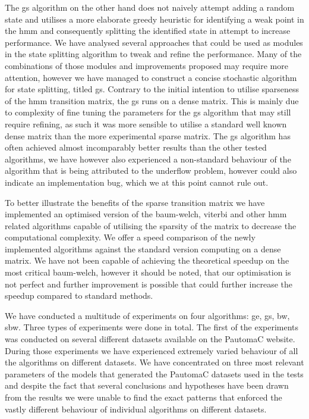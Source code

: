 The \acrlong{gs} algorithm on the other hand does not naively attempt adding a random state and utilises a more elaborate greedy heuristic for identifying a weak point in the \gls{hmm} and consequently splitting the identified state in attempt to increase performance. We have analysed several approaches that could be used as modules in the state splitting algorithm to tweak and refine the performance. Many of the combinations of those modules and improvements proposed may require more attention, however we have managed to construct a concise stochastic algorithm for state splitting, titled \acrlong{gs}. Contrary to the initial intention to utilise sparseness of the \gls{hmm} transition matrix, the \gls{gs} runs on a dense matrix. This is mainly due to complexity of fine tuning the parameters for the \gls{gs} algorithm that may still require refining, as such it was more sensible to utilise a standard well known dense matrix than the more experimental sparse matrix. The \gls{gs} algorithm has often achieved almost incomparably better results than the other tested algorithms, we have however also experienced a non-standard behaviour of the algorithm that is being attributed to the underflow problem, however could also indicate an implementation bug, which we at this point cannot rule out.

To better illustrate the benefits of the sparse transition matrix we have implemented an optimised version of the \gls{baum-welch}, \gls{viterbi} and other \gls{hmm} related algorithms capable of utilising the sparsity of the matrix to decrease the computational complexity. We offer a speed comparison of the newly implemented algorithms against the standard version computing on a dense matrix. We have not been capable of achieving the theoretical speedup on the most critical \gls{baum-welch}, however it should be noted, that our optimisation is not perfect and further improvement is possible that could further increase the speedup compared to standard methods.

We have conducted a multitude of experiments on four algorithms: \acrlong{ge}, \acrlong{gs}, \acrlong{bw}, \acrlong{sbw}. Three types of experiments were done in total. The first of the experiments was conducted on several different datasets available on the PautomaC website. During those experiments we have experienced extremely varied behaviour of all the algorithms on different datasets. We have concentrated on three most relevant parameters of the models that generated the PautomaC datasets used in the tests and despite the fact that several conclusions and hypotheses have been drawn from the results we were unable to find the exact patterns that enforced the vastly different behaviour of individual algorithms on different datasets.

